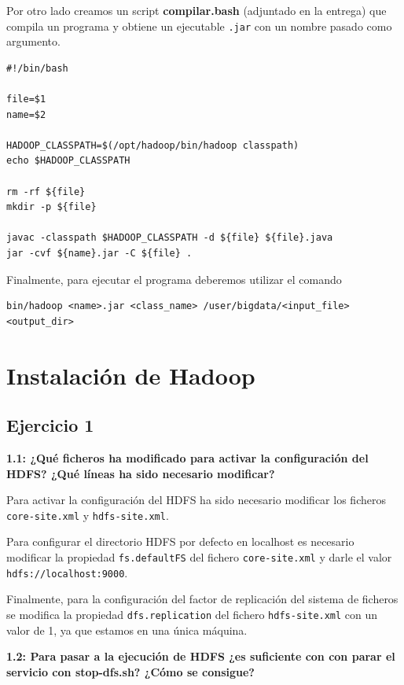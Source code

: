 \documentclass[10pt,swedish, openany]{book}
\begin{document}
Por otro lado creamos un script \textbf{compilar.bash} (adjuntado en la entrega) que compila un programa y obtiene un ejecutable \texttt{.jar} con un nombre pasado como argumento.
\begin{lstlisting}
#!/bin/bash

file=$1
name=$2

HADOOP_CLASSPATH=$(/opt/hadoop/bin/hadoop classpath)
echo $HADOOP_CLASSPATH

rm -rf ${file}
mkdir -p ${file}

javac -classpath $HADOOP_CLASSPATH -d ${file} ${file}.java
jar -cvf ${name}.jar -C ${file} .
\end{lstlisting}

Finalmente, para ejecutar el programa deberemos utilizar el comando
\begin{lstlisting}
bin/hadoop <name>.jar <class_name> /user/bigdata/<input_file> <output_dir>
\end{lstlisting}

\section{Instalación de Hadoop}

\subsection*{Ejercicio 1}
\textbf{1.1: ¿Qué ficheros ha modificado para activar la configuración del HDFS? ¿Qué líneas ha sido necesario modificar?}

Para activar la configuración del HDFS ha sido necesario modificar los ficheros \texttt{core-site.xml} y \texttt{hdfs-site.xml}.

Para configurar el directorio HDFS por defecto en localhost es necesario modificar la propiedad \texttt{fs.defaultFS} del fichero \texttt{core-site.xml} y darle el valor \texttt{hdfs://localhost:9000}.

Finalmente, para la configuración del factor de replicación del sistema de ficheros se modifica la propiedad \texttt{dfs.replication} del fichero \texttt{hdfs-site.xml} con un valor de 1, ya que estamos en una única máquina.

\vspace{0.8em}

\textbf{1.2: Para pasar a la ejecución de HDFS ¿es suficiente con con parar el servicio con stop-dfs.sh? ¿Cómo se consigue?}
\end{document}
